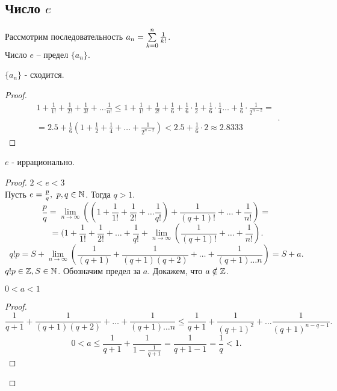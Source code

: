 \documentclass[12pt]{report}
\begin{document}
\subsection{Число $e$}\label{ques_28}
\begin{defn}
    Рассмотрим последовательность $a_n = \sum\limits_{k=0}^n \frac{1}{k!}$.\\
    Число $e$ -- предел $\{a_n\}$. 
\end{defn}
\begin{st}
    $\{a_n\}$ - сходится.
\end{st}
\begin{proof}
    \[
	\begin{array}{c}
	1 + \frac{1}{1!} + \frac{1}{2!} + \frac{1}{3!} + \ldots \frac{1}{n!} \le 1 + \frac{1}{1!} +\frac{1}{2!} + \frac{1}{6} + \frac{1}{6}\cdot \frac{1}{2} + \frac{1}{6}\cdot \frac{1}{4} \ldots + \frac{1}{6} \cdot \frac{1}{2^{n-2}} = \\ \\
	= 2.5 +\frac{1}{6} (1 + \frac{1}{2} + \frac{1}{4} + \ldots +\frac{1}{2^{n-2}}) < 2.5 + \frac{1}{6} \cdot 2 \approx 2.8333
	\end{array}
    .\] 
\end{proof}
\begin{thm}
    $e$ - иррационально.
\end{thm}
\begin{proof}
    $2 < e < 3$ \\
    Пусть $e = \frac{p}{q}, ~p, q \in \mathbb{N}$. Тогда $q > 1$.
    \[
	\frac{p}{q} = \lim\limits_{n \to \infty} \left ( (1 + \frac{1}{1!} + \frac{1}{2!} + \ldots \frac{1}{q!}) + \frac{1}{(q+1)!} + \ldots +\frac{1}{n!} \right) = 
    \] 
    \[
	= (1 + \frac{1}{1!} + \frac{1}{2!} + \ldots  + \frac{1}{q!} + \lim\limits_{n \to \infty} \left ( \frac{1}{(q+1)!} + \ldots + \frac{1}{n!} \right)
    .\] 
    \[
	q! p = S + \lim\limits_{n \to \infty} \left ( \frac{1}{(q+1)} + \frac{1}{(q+1)(q+2)} +\ldots + \frac{1}{(q+1) \ldots n} \right) = S + a
    .\] 
    $q! p \in \mathbb{Z}, S \in \mathbb{N}$. Обозначим предел за $a$.
    Докажем, что $a \notin \mathbb{Z}$. 
    \begin{st}
	$0 < a < 1$
    \end{st}
    \begin{proof}
        \[
	    \frac{1}{q+1} + \frac{1}{(q+1)(q+2)} + \ldots + \frac{1}{(q+1) \ldots  n} \le \frac{1}{q+1} + \frac{1}{(q+1)^2} + \ldots \frac{1}{(q+1)^{n-q-1}}
        .\] 
	\[
	0<a \le \frac{1}{q+1} + \frac{1}{1- \frac{1}{q+1}} = \frac{1}{q+1-1} = \frac{1}{q} <1
	.\] 
    \end{proof}
\end{proof}
\end{document}
